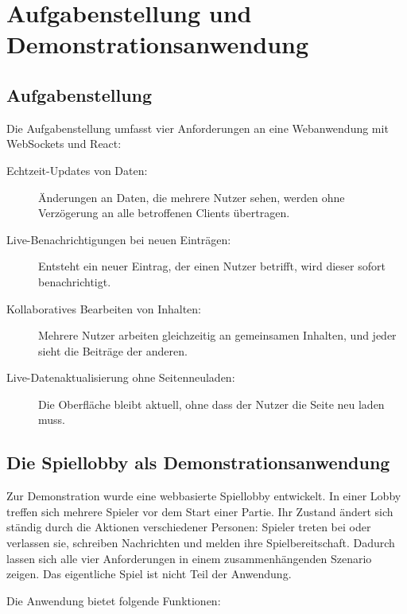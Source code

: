 \chapter{Aufgabenstellung und Demonstrationsanwendung}
\label{kap:aufgabe}
\verfasser{\autorDG}

\section{Aufgabenstellung}

Die Aufgabenstellung umfasst vier Anforderungen an eine Webanwendung mit WebSockets und React:

\begin{description}
  \item[Echtzeit-Updates von Daten:] Änderungen an Daten, die mehrere Nutzer sehen, werden ohne Verzögerung an alle betroffenen Clients übertragen.
  \item[Live-Benachrichtigungen bei neuen Einträgen:] Entsteht ein neuer Eintrag, der einen Nutzer betrifft, wird dieser sofort benachrichtigt.
  \item[Kollaboratives Bearbeiten von Inhalten:] Mehrere Nutzer arbeiten gleichzeitig an gemeinsamen Inhalten, und jeder sieht die Beiträge der anderen.
  \item[Live-Datenaktualisierung ohne Seitenneuladen:] Die Oberfläche bleibt aktuell, ohne dass der Nutzer die Seite neu laden muss.
\end{description}

\section{Die Spiellobby als Demonstrationsanwendung}

Zur Demonstration wurde eine webbasierte Spiellobby entwickelt. In einer Lobby treffen sich mehrere Spieler vor dem Start einer Partie. Ihr Zustand ändert sich ständig durch die Aktionen verschiedener Personen: Spieler treten bei oder verlassen sie, schreiben Nachrichten und melden ihre Spielbereitschaft. Dadurch lassen sich alle vier Anforderungen in einem zusammenhängenden Szenario zeigen. Das eigentliche Spiel ist nicht Teil der Anwendung.

Die Anwendung bietet folgende Funktionen:

